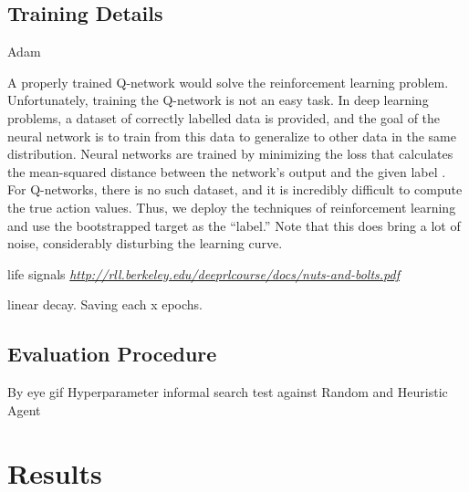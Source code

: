 \documentclass[
  openany]{book}
\begin{document}
\hypertarget{training-details}{%
\subsection{Training Details}\label{training-details}}

Adam

A properly trained Q-network would solve the reinforcement learning problem. Unfortunately, training the Q-network is not an easy task. In deep learning problems, a dataset of correctly labelled data is provided, and the goal of the neural network is to train from this data to generalize to other data in the same distribution. Neural networks are trained by minimizing the loss that calculates the mean-squared distance between the network's output and the given label . For Q-networks, there is no such dataset, and it is incredibly difficult to compute the true action values. Thus, we deploy the techniques of reinforcement learning and use the bootstrapped target as the ``label.'' Note that this does bring a lot of noise, considerably disturbing the learning curve.

life signals
\emph{\url{http://rll.berkeley.edu/deeprlcourse/docs/nuts-and-bolts.pdf}}

linear decay.
Saving each x epochs.

\hypertarget{evaluation-procedure}{%
\subsection{Evaluation Procedure}\label{evaluation-procedure}}

By eye gif
Hyperparameter informal search
test against Random and Heuristic Agent

\hypertarget{results}{%
\section{Results}\label{results}}
\end{document}
